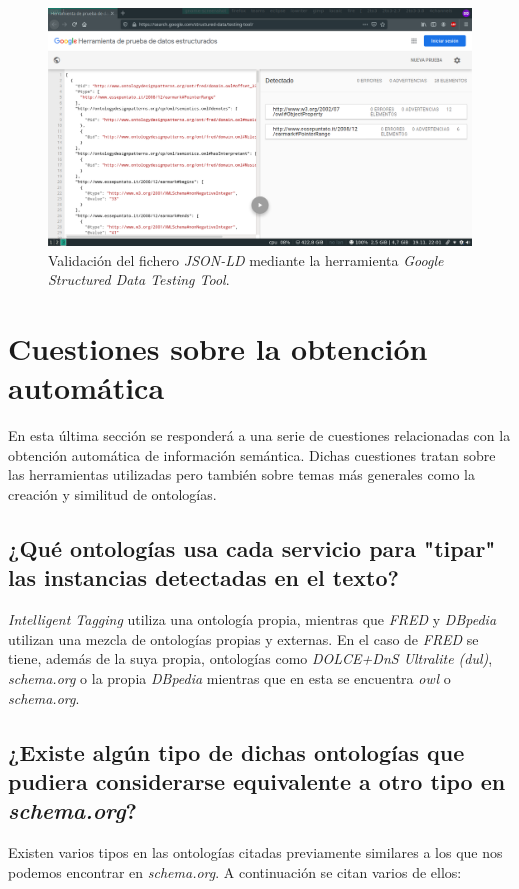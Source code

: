 \documentclass[11pt]{article}
\begin{document}
\begin{figure}[h]
\caption{Validación del fichero \textit{JSON-LD} mediante la herramienta \textit{Google Structured Data Testing Tool}.}
\centering
\includegraphics[width=\textwidth]{fred_3}
\end{figure}
\section{Cuestiones sobre la obtención automática}
En esta última sección se responderá a una serie de cuestiones relacionadas con la obtención automática de información semántica. Dichas cuestiones tratan sobre las herramientas utilizadas pero también sobre temas más generales como la creación y similitud de ontologías.

\subsection{¿Qué ontologías usa cada servicio para "tipar" las instancias detectadas en el texto?}
\textit{Intelligent Tagging} utiliza una ontología propia, mientras que \textit{FRED} y \textit{DBpedia} utilizan una mezcla de ontologías propias y externas. En el caso de \textit{FRED} se tiene, además de la suya propia, ontologías como \textit{DOLCE+DnS Ultralite (dul)}, \textit{schema.org} o la propia \textit{DBpedia} mientras que en esta se encuentra \textit{owl} o \textit{schema.org}.

\subsection{¿Existe algún tipo de dichas ontologías que pudiera considerarse equivalente a otro tipo en \textit{schema.org}?}
Existen varios tipos en las ontologías citadas previamente similares a los que nos podemos encontrar en \textit{schema.org}. A continuación se citan varios de ellos:
\end{document}
